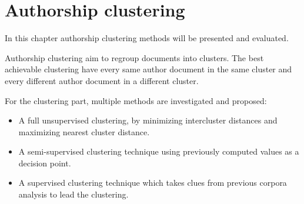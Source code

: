 \section{Authorship clustering \label{sec:clustering}}

In this chapter authorship clustering methods will be presented and evaluated.

Authorship clustering aim to regroup documents into clusters.
The best achievable clustering have every same author document in the same cluster and every different author document in a different cluster.

For the clustering part, multiple methods are investigated and proposed:
\begin{itemize}
  \item
  A full unsupervised clustering, by minimizing intercluster distances and maximizing nearest cluster distance.
  \item
  A semi-supervised clustering technique using previously computed values as a decision point.
  \item
  A supervised clustering technique which takes clues from previous corpora analysis to lead the clustering.
\end{itemize}






